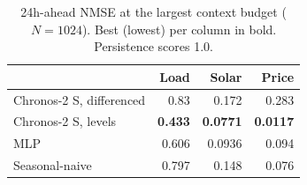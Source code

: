 \begin{table}[H]
\centering
\caption{24h-ahead NMSE at the largest context budget ($N=1024$). Best (lowest) per column in bold. Persistence scores 1.0.}
\label{tab:forecast_component}
\begin{tabular}{lrrr}
\toprule
 & Load & Solar & Price \\
\midrule
Chronos-2 S, differenced & 0.83 & 0.172 & 0.283 \\
Chronos-2 S, levels & \textbf{0.433} & \textbf{0.0771} & \textbf{0.0117} \\
MLP & 0.606 & 0.0936 & 0.094 \\
Seasonal-naive & 0.797 & 0.148 & 0.076 \\
\bottomrule
\end{tabular}
\end{table}
